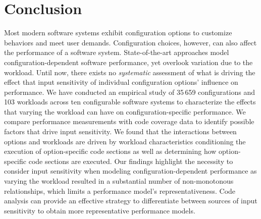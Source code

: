\section{Conclusion}\label{sec:conclusion}
Most modern software systems exhibit configuration options to customize behaviors and meet user demands. Configuration choices, however, can also affect the performance of a software system.
State-of-the-art approaches model configuration-dependent software performance, yet overlook variation due to the workload. Until now, there exists no \textit{systematic} assessment of what is driving the effect that input sensitivity of individual configuration options’ influence on performance. We have conducted an empirical study of {\color{red}35\,659 configurations and 103 workloads across ten} configurable software systems to characterize the effects that varying the workload can have on configuration-specific performance. We compare performance measurements with code coverage data to identify possible factors that drive input sensitivity. We found that the interactions between options and workloads are driven by workload characteristics conditioning the execution of option-specific code sections as well as determining how option-specific code sections are executed. Our findings highlight the necessity to consider input sensitivity when modeling configuration-dependent performance as varying the workload resulted in a substantial number of non-monotonous relationships, which limits a performance model's representativeness. Code analysis can provide an effective strategy to differentiate between sources of input sensitivity to obtain more representative performance models.

